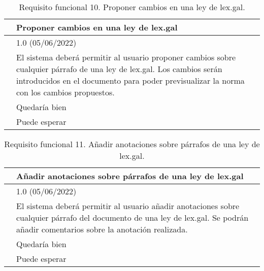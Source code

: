 \begin{table}[H]
\begin{center}
\begin{tabular}{|p{3cm}|p{10cm}|} \hline
\centering {\bf FRQ-10} & Proponer cambios en una ley de lex.gal  \\ \hline\hline
\centering {\bf Versión} & 1.0 (05/06/2022) \\ \hline
\centering {\bf Descripción} & El sistema deberá permitir al usuario proponer cambios sobre cualquier párrafo de una ley de lex.gal. Los cambios serán introducidos en el documento para poder previsualizar la norma con los cambios propuestos. \\ \hline
\centering {\bf Importancia} & Quedaría bien \\ \hline
\centering {\bf Urgencia} & Puede esperar \\ \hline
\end{tabular}
\caption{Requisito funcional 10. Proponer cambios en una ley de lex.gal.}
\label{enlaceFRQ10}
\end{center}
\end{table}

\begin{table}[H]
\begin{center}
\begin{tabular}{|p{3cm}|p{10cm}|} \hline
\centering {\bf FRQ-11} & Añadir anotaciones sobre párrafos de una ley de lex.gal  \\ \hline\hline
\centering {\bf Versión} & 1.0 (05/06/2022) \\ \hline
\centering {\bf Descripción} & El sistema deberá permitir al usuario añadir anotaciones sobre cualquier párrafo del documento de una ley de lex.gal. Se podrán añadir comentarios sobre la anotación realizada. \\ \hline
\centering {\bf Importancia} & Quedaría bien \\ \hline
\centering {\bf Urgencia} & Puede esperar \\ \hline
\end{tabular}
\caption{Requisito funcional 11. Añadir anotaciones sobre párrafos de una ley de lex.gal.}
\label{enlaceFRQ11}
\end{center}
\end{table}

